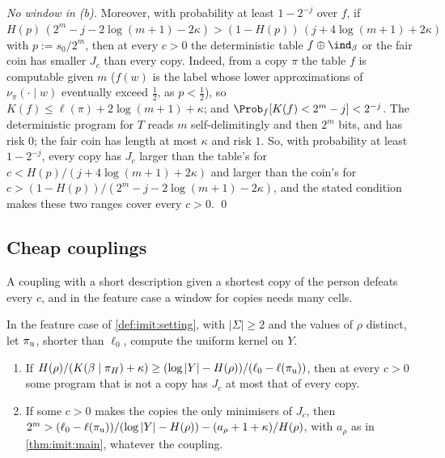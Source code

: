 \emph{No window in (b).} Moreover, with probability at least $1-2^{-j}$ over $f$, if $H(p)\,(2^m-j-2\log(m+1)-2\kappa)>(1-H(p))\,(j+4\log(m+1)+2\kappa)$ with $p:=s_0/2^m$, then at every $c>0$ the deterministic table $f\oplus\ind_\beta$ or the fair coin has smaller $J_c$ than every copy. Indeed, from a copy $\pi$ the table $f$ is computable given $m$ ($f(w)$ is the label whose lower approximations of $\nu_\pi(\cdot\mid w)$ eventually exceed $\frac12$, as $p<\frac12$), so $K(f)\le\ell(\pi)+2\log(m+1)+\kappa$; and $\Prob_f[K(f)<2^m-j]<2^{-j}$. The deterministic program for $T$ reads $m$ self-delimitingly and then $2^m$ bits, and has risk $0$; the fair coin has length at most $\kappa$ and risk $1$. So, with probability at least $1-2^{-j}$, every copy has $J_c$ larger than the table's for $c<H(p)/(j+4\log(m+1)+2\kappa)$ and larger than the coin's for $c>(1-H(p))/(2^m-j-2\log(m+1)-2\kappa)$, and the stated condition makes these two ranges cover every $c>0$. \qed

\subsection{Cheap couplings}\label{app:imit:cheap}

A coupling with a short description given a shortest copy of the person defeats every $c$, and in the feature case a window for copies needs many cells.

\begin{proposition}\label{prop:imit:cheap}
In the feature case of \cref{def:imit:setting}, with $|\Sigma|\ge2$ and the values of $\rho$ distinct, let $\pi_{\rm u}$, shorter than $\ell_0$, compute the uniform kernel on $Y$.
\begin{enumerate}[label=(\roman*),itemsep=0pt,topsep=2pt]
\item If $H(\rho)/(K(\beta\mid\pi_H)+\kappa)\ge(\log|Y|-H(\rho))/(\ell_0-\ell(\pi_{\rm u}))$, then at every $c>0$ some program that is not a copy has $J_c$ at most that of every copy.
\item If some $c>0$ makes the copies the only minimisers of $J_c$, then $2^m>(\ell_0-\ell(\pi_{\rm u}))/(\log|Y|-H(\rho))-(a_\rho+1+\kappa)/H(\rho)$, with $a_\rho$ as in \cref{thm:imit:main}, whatever the coupling.
\end{enumerate}
\end{proposition}

